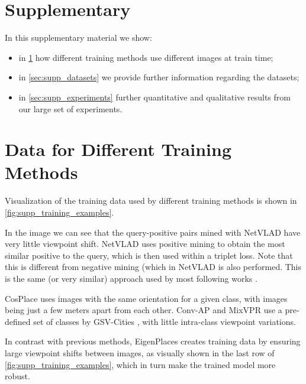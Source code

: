 \documentclass[10pt,twocolumn,letterpaper]{article}
\begin{document}
\section*{Supplementary}
In this supplementary material we show:
\begin{itemize}[noitemsep,topsep=1pt]
    \item in \cref{sec:supp_different_training_methods} how different training methods use different images at train time;
    \item in \cref{sec:supp_datasets} we provide further information regarding the datasets;
    \item in \cref{sec:supp_experiments} further quantitative and qualitative results from our large set of experiments.
\end{itemize}



\section{Data for Different Training Methods}
\label{sec:supp_different_training_methods}

Visualization of the training data used by different training methods is shown in \cref{fig:supp_training_examples}.

In the image we can see that the query-positive pairs mined with NetVLAD \cite{Arandjelovic_2018_netvlad} have very little viewpoint shift. 
NetVLAD \cite{Zhang_2021_gated_netvlad} uses positive mining to obtain the most similar positive to the query, which is then used within a triplet loss. Note that this is different from negative mining (which in NetVLAD is also performed. This is the same (or very similar) approach used by most following works \cite{Kim_2017_crn, Liu_2019_sare, Ge_2020_sfrs, Zhu_2018_apanet, Peng_2021_appsvr, Peng_2021_sralNet, Hausler_2021_patch_netvlad}.

CosPlace \cite{Berton_2022_cosPlace} uses images with the same orientation for a given class, with images being just a few meters apart from each other.
Conv-AP \cite{Alibey_2022_gsvcities} and MixVPR \cite{Alibey_2023_mixvpr} use a pre-defined set of classes by GSV-Cities \cite{Alibey_2022_gsvcities}, with little intra-class viewpoint variations.

In contrast with previous methods, EigenPlaces creates training data by ensuring large viewpoint shifts between images, as visually shown in the last row of \cref{fig:supp_training_examples}, which in turn make the trained model more robust.
\end{document}
